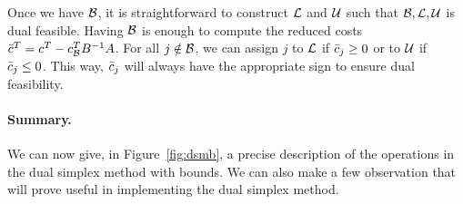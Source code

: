 Once we have $\mathcal{B}$, it is straightforward to construct $\mathcal{L}$ and $\mathcal{U}$
such that $\mathcal{B}, \mathcal{L}, \mathcal{U}$ is dual feasible. Having $\mathcal{B}$ is enough
to compute the reduced costs $\bar c^T = c^T - c_{\mathcal{B}}^T B^{-1} A$.
For all $j \notin \mathcal{B}$, we can assign $j$ to $\mathcal{L}$ if $\bar c_j \geq 0$
or to $\mathcal{U}$ if $\bar c_j \leq 0$. This way, $\bar c_j$ will always have
the appropriate sign to ensure dual feasibility.

\paragraph{Summary.} We can now give, in Figure~\ref{fig:dsmb},
a precise description of the operations in the dual simplex method with bounds.
We can also make a few observation that will prove useful in implementing
the dual simplex method.

